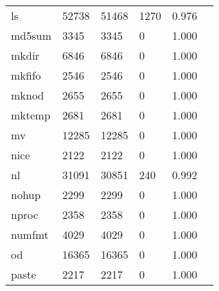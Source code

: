 \begin{longtable}{lp{2.4cm}p{2.4cm}p{2.4cm}p{2.4cm}p{2.4cm}}
ls        &                                   52738 &                       51468 &                         1270 &                                   0.976 \\
md5sum    &                                    3345 &                        3345 &                            0 &                                   1.000 \\
mkdir     &                                    6846 &                        6846 &                            0 &                                   1.000 \\
mkfifo    &                                    2546 &                        2546 &                            0 &                                   1.000 \\
mknod     &                                    2655 &                        2655 &                            0 &                                   1.000 \\
mktemp    &                                    2681 &                        2681 &                            0 &                                   1.000 \\
mv        &                                   12285 &                       12285 &                            0 &                                   1.000 \\
nice      &                                    2122 &                        2122 &                            0 &                                   1.000 \\
nl        &                                   31091 &                       30851 &                          240 &                                   0.992 \\
nohup     &                                    2299 &                        2299 &                            0 &                                   1.000 \\
nproc     &                                    2358 &                        2358 &                            0 &                                   1.000 \\
numfmt    &                                    4029 &                        4029 &                            0 &                                   1.000 \\
od        &                                   16365 &                       16365 &                            0 &                                   1.000 \\
paste     &                                    2217 &                        2217 &                            0 &                                   1.000 \\

\end{longtable}
